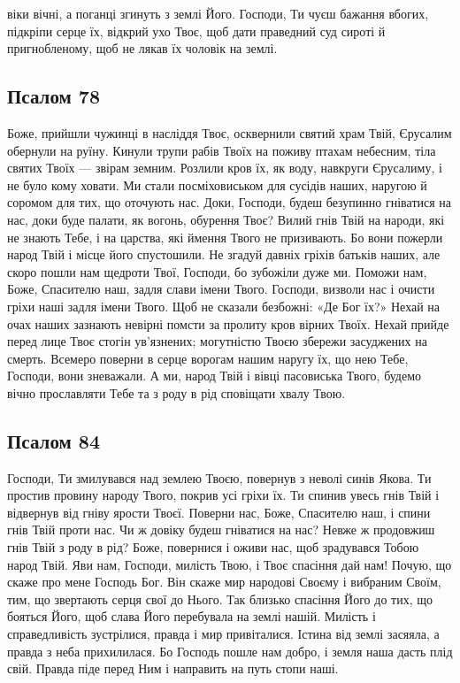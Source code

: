 \documentclass[chapters.tex]{subfiles}
\begin{document}
віки вічні, а поганці згинуть з землі Його. Господи, Ти чуєш бажання вбогих, підкріпи серце їх, відкрий ухо Твоє, щоб дати праведний суд сироті й пригнобленому, щоб не лякав їх чоловік на землі.

\subsection{Псалом 78}

Боже, прийшли чужинці в насліддя Твоє, осквернили святий храм Твій, Єрусалим обернули на руїну. Кинули трупи рабів Твоїх на поживу птахам небесним, тіла святих Твоїх — звірам земним. Розлили кров їх, як воду, навкруги Єрусалиму, і не було кому ховати. Ми стали посміховиськом для сусідів наших, наругою й соромом для тих, що оточують нас. Доки, Господи, будеш безупинно гніватися на нас, доки буде палати, як вогонь, обурення Твоє? Вилий гнів Твій на народи, які не знають Тебе, і на царства, які ймення Твого не призивають. Бо вони пожерли народ Твій і місце його спустошили. Не згадуй давніх гріхів батьків наших, але скоро пошли нам щедроти Твої, Господи, бо зубожіли дуже ми. Поможи нам, Боже, Спасителю наш, задля слави імени Твого. Господи, визволи нас і очисти гріхи наші задля імени Твого. Щоб не сказали безбожні: «Де Бог їх?» Нехай на очах наших зазнають невірні помсти за пролиту кров вірних Твоїх. Нехай прийде перед лице Твоє стогін ув’язнених; могутністю Твоєю збережи засуджених на смерть. Всемеро поверни в серце ворогам нашим наругу їх, що нею Тебе, Господи, вони зневажали. А ми, народ Твій і вівці пасовиська Твого, будемо вічно прославляти Тебе та з роду в рід сповіщати хвалу Твою.

\subsection{Псалом 84}

Господи, Ти змилувався над землею Твоєю, повернув з неволі синів Якова. Ти простив провину народу Твого, покрив усі гріхи їх. Ти спинив увесь гнів Твій і відвернув від гніву ярости Твоєї. Поверни нас, Боже, Спасителю наш, і спини гнів Твій проти нас. Чи ж довіку будеш гніватися на нас? Невже ж продовжиш гнів Твій з роду в рід? Боже, повернися і оживи нас, щоб зрадувався Тобою народ Твій. Яви нам, Господи, милість Твою, і Твоє спасіння дай нам! Почую, що скаже про мене Господь Бог. Він скаже мир народові Своєму і вибраним Своїм, тим, що звертають серця свої до Нього. Так близько спасіння Його до тих, що бояться Його, щоб слава Його перебувала на землі нашій. Милість і справедливість зустрілися, правда і мир привіталися. Істина від землі засяяла, а правда з неба прихилилася. Бо Господь пошле нам добро, і земля наша дасть плід свій. Правда піде перед Ним і направить на путь стопи наші.
\end{document}

